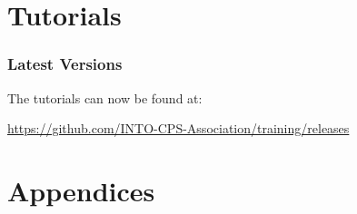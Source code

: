 \documentclass[narrowmargin,final,12pt,a4paper]{include/intocpslargereport}   %
\begin{document}
\part{Tutorials}
\label{part:tutorials}

\section*{Latest Versions}

The tutorials can now be found at:

\url{https://github.com/INTO-CPS-Association/training/releases}

%
%
%
%
%
%
%
%
%
%
%
%
%
%
%


\part{Appendices}
\appendix

\newpage


%
\end{document}
